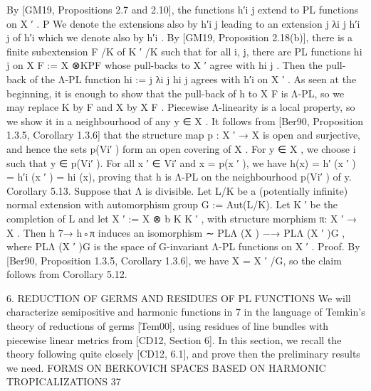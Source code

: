 \documentclass[
  10pt,
]{article}
\newenvironment{Shaded}{}{}
\newcommand{\NormalTok}[1]{#1}
\begin{document}
\begin{Shaded}
\begin{Highlighting}[]
\NormalTok{By [GM19, Propositions 2.7 and 2.10], the functions h′i j extend to PL functions on X ′ .}
\NormalTok{                                                                           P}
\NormalTok{We denote the extensions also by h′i j leading to an extension j λi j h′i j of h′i which we}
\NormalTok{denote also by h′i . By [GM19, Proposition 2.18(b)], there is a finite subextension F /K of}
\NormalTok{K ′ /K such that for all i, j, there are PL functions hi j on X F := X ⊗KPF whose pull{-}backs}
\NormalTok{to X ′ agree with hi j . Then the pull{-}back of the Λ{-}PL function hi := j λi j hi j agrees with}
\NormalTok{h′i on X ′ . As seen at the beginning, it is enough to show that the pull{-}back of h to X F is}
\NormalTok{Λ{-}PL, so we may replace K by F and X by X F . Piecewise Λ{-}linearity is a local property, so}
\NormalTok{we show it in a neighbourhood of any y ∈ X . It follows from [Ber90, Proposition 1.3.5,}
\NormalTok{Corollary 1.3.6] that the structure map p : X ′ → X is open and surjective, and hence the}
\NormalTok{sets p(Vi′ ) form an open covering of X . For y ∈ X , we choose i such that y ∈ p(Vi′ ). For}
\NormalTok{all x ′ ∈ Vi′ and x = p(x ′ ), we have h(x) = h′ (x ′ ) = h′i (x ′ ) = hi (x), proving that h is Λ{-}PL}
\NormalTok{on the neighbourhood p(Vi′ ) of y.                                                                 }
\NormalTok{Corollary 5.13. Suppose that Λ is divisible. Let L/K be a (potentially infinite) normal}
\NormalTok{extension with automorphism group G := Aut(L/K). Let K ′ be the completion of L and let}
\NormalTok{X ′ := X ⊗}
\NormalTok{         b K K ′ , with structure morphism π: X ′ → X . Then h 7→ h◦π induces an isomorphism}
\NormalTok{          ∼}
\NormalTok{PLΛ (X ) −→ PLΛ (X ′ )G , where PLΛ (X ′ )G is the space of G{-}invariant Λ{-}PL functions on X ′ .}
\NormalTok{Proof. By [Ber90, Proposition 1.3.5, Corollary 1.3.6], we have X = X ′ /G, so the claim}
\NormalTok{follows from Corollary 5.12.                                                          }

\NormalTok{                 6. REDUCTION OF GERMS AND RESIDUES OF PL FUNCTIONS}
\NormalTok{   We will characterize semipositive and harmonic functions in 7 in the language of}
\NormalTok{Temkin’s theory of reductions of germs [Tem00], using residues of line bundles with}
\NormalTok{piecewise linear metrics from [CD12, Section 6]. In this section, we recall the theory}
\NormalTok{following quite closely [CD12, 6.1], and prove then the preliminary results we need.}
\NormalTok{                  FORMS ON BERKOVICH SPACES BASED ON HARMONIC TROPICALIZATIONS                                   37}


\end{Highlighting}
\end{Shaded}
\end{document}
